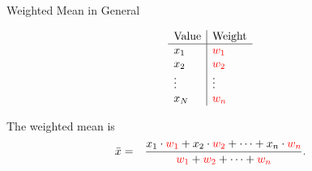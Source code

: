 \begin{frame}{Weighted Mean in General}

  \begin{eqnarray*}
    \begin{array}{l|l}
      \mathrm{Value}  & \mathrm{Weight} \\ \hline
      x_1 & {\color{red}w_1} \\
      x_2 & {\color{red}w_2} \\
      \vdots & \vdots \\
      x_N & {\color{red}w_n}
    \end{array}
  \end{eqnarray*}

  The weighted mean is 
  \begin{eqnarray*}
    \bar{x} & = & \frac{x_1\cdot{\color{red}w_1} + x_2\cdot{\color{red}w_2} +
      \cdots + x_n\cdot{\color{red}w_n}}{
      {\color{red}w_1}+{\color{red}w_2}+\cdots+{\color{red}w_n}}.
  \end{eqnarray*}
  
\end{frame}




